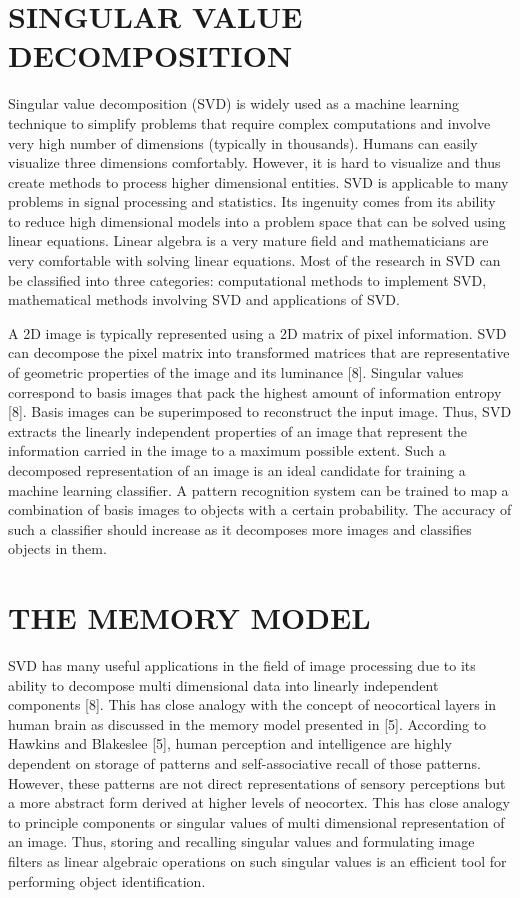 \documentclass[12pt,a4paper]{article}
\begin{document}
	\section{\large SINGULAR VALUE DECOMPOSITION}
	\indent \par Singular value decomposition (SVD) is widely used as a machine learning technique to simplify problems that require complex computations and involve very high number of dimensions (typically in thousands). Humans can easily visualize three dimensions comfortably. However, it is hard to visualize and thus create methods to process higher dimensional entities. SVD is applicable to many problems in signal processing and statistics. Its ingenuity comes from its ability to reduce high dimensional models into a problem space that can be solved using linear equations. Linear algebra is a very mature field and mathematicians are very comfortable with solving linear equations. Most of the research in SVD can be classified into three categories: computational methods to implement SVD, mathematical methods involving SVD and applications of SVD. \par
    A 2D image is typically represented using a 2D matrix of pixel information. SVD can decompose the pixel matrix into transformed matrices that are representative of geometric properties of the image and its luminance [8]. Singular values correspond to basis images that pack the highest amount of information entropy [8]. Basis images can be superimposed to reconstruct the input image. Thus, SVD extracts the linearly independent properties of an image that represent the information carried in the image to a maximum possible extent. Such a decomposed representation of an image is an ideal candidate for training a machine learning classifier. A pattern recognition system can be trained to map a combination of basis images to objects with a certain probability. The accuracy of such a classifier should increase as it decomposes more images and classifies objects in them.
    
	\section{\large THE MEMORY MODEL}
    \indent \par SVD has many useful applications in the field of image processing due to its ability to decompose multi dimensional data into linearly independent components [8]. This has close analogy with the concept of neocortical layers in human brain as discussed in the memory model presented in [5]. According to Hawkins and Blakeslee [5], human perception and intelligence are highly dependent on storage of patterns and self-associative recall of those patterns. However, these patterns are not direct representations of sensory perceptions but a more abstract form derived at higher levels of neocortex. This has close analogy to principle components or singular values of multi dimensional representation of an image. Thus, storing and recalling singular values and formulating image filters as linear algebraic operations on such singular values is an efficient tool for performing object identification.
\end{document}
